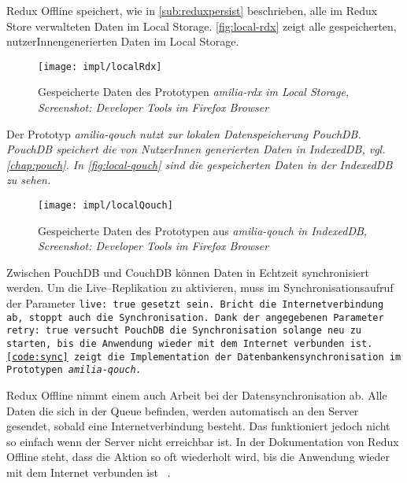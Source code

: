 %
%
Redux Offline speichert, wie in \autoref{sub:reduxpersist} beschrieben, alle im Redux Store verwalteten Daten im Local Storage.
\autoref{fig:local-rdx} zeigt alle gespeicherten, nutzerInnengenerierten Daten im Local Storage.
%
\begin{figure}[H]
  \centering
  \texttt{[image: impl/localRdx]}
  \grayRule
  \caption[Gespeicherte Daten im Local Storage]{Gespeicherte Daten des Prototypen \it{amilia-rdx} im Local Storage,\\Screenshot: Developer Tools im Firefox Browser}
  \label{fig:local-rdx}
\end{figure}
% 
Der Prototyp \it{amilia-qouch} nutzt zur lokalen Datenspeicherung PouchDB. PouchDB speichert die von NutzerInnen generierten Daten in IndexedDB, vgl. \autoref{chap:pouch}. In \autoref{fig:local-qouch} sind die gespeicherten Daten in der IndexedDB zu sehen.
%
\begin{figure}[H]
  \centering
  \texttt{[image: impl/localQouch]}
  \grayRule
  \caption[Gespeicherte Daten in IndexedDB]{Gespeicherte Daten des Prototypen aus \it{amilia-qouch} in IndexedDB,\\Screenshot: Developer Tools im Firefox Browser}
  \label{fig:local-qouch}
\end{figure}
%
%
Zwischen PouchDB und CouchDB können Daten in Echtzeit synchronisiert werden.
Um die Live--Replikation zu aktivieren, muss im Synchronisationsaufruf der Parameter \tt{live: true} gesetzt sein.
Bricht die Internetverbindung ab, stoppt auch die Synchronisation.
Dank der angegebenen Parameter \tt{retry: true} versucht PouchDB die Synchronisation solange neu zu starten, bis die Anwendung wieder mit dem Internet verbunden ist. \autoref{code:sync} zeigt die Implementation der Datenbankensynchronisation im Prototypen \it{amilia-qouch}.
%
\begin{center}
  
\end{center}
% 
Redux Offline nimmt einem auch Arbeit bei der Datensynchronisation ab.
Alle Daten die sich in der Queue befinden, werden automatisch an den Server gesendet, sobald eine Internetverbindung besteht.
Das funktioniert jedoch nicht so einfach wenn der Server nicht erreichbar ist.
In der Dokumentation von Redux Offline steht, dass die Aktion so oft wiederholt wird, bis die Anwendung wieder mit dem Internet verbunden ist ~\cite{giving-up}.
